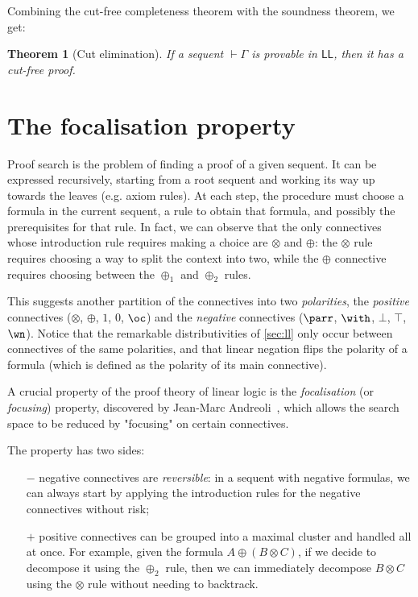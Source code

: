 \documentclass[11pt]{article}
\newtheorem{theorem}{Theorem}[section]
\newcommand\LL{\textsf{LL}}
\newcommand\0{\textbf{0}}
\newcommand\1{\textbf{1}}
\begin{document}
Combining the cut-free completeness theorem with the soundness theorem, we get:
\begin{theorem}[Cut elimination]
    If a sequent $\vdash \Gamma$ is provable in $\LL$, then it has a cut-free proof.
\end{theorem}

\section{\label{sec:focalisation}The focalisation property}

Proof search is the problem of finding a proof of a given sequent. It can be expressed recursively, starting
from a root sequent and working its way up towards the leaves (e.g. axiom rules). At each step, the procedure
must choose a formula in the current sequent, a rule to obtain that formula, and possibly the prerequisites for
that rule. In fact, we can observe that the only connectives whose introduction rule requires making a choice are
$\otimes$ and $\oplus$: the $\otimes$ rule requires choosing a way to split the context into two, while the $\oplus$
connective requires choosing between the $\oplus_1$ and $\oplus_2$ rules.

This suggests another partition of the connectives into two \emph{polarities}, the \emph{positive} connectives
($\otimes$, $\oplus$, $1$, $0$, $\oc$) and the \emph{negative} connectives ($\parr$, $\with$, $\bot$, $\top$, $\wn$).
Notice that the remarkable distributivities of \cref{sec:ll} only occur between connectives of the same polarities,
and that linear negation flips the polarity of a formula (which is defined as the polarity of its main connective).

A crucial property of the proof theory of linear logic is the \emph{focalisation} (or \emph{focusing}) property,
discovered by Jean-Marc Andreoli~\cite{andreoli}, which allows the search space to be reduced by "focusing" on certain
connectives.

The property has two sides:
\begin{itemize}
    \item[$-$] negative connectives are \emph{reversible}: in a sequent with negative formulas,
    we can always start by applying the introduction rules for the negative connectives without risk;
    \item[$+$] positive connectives can be grouped into a maximal cluster and handled all at once.
    For example, given the formula $A \oplus (B \otimes C)$, if we decide to decompose it using the $\oplus_2$ rule,
    then we can immediately decompose $B \otimes C$ using the $\otimes$ rule without needing to backtrack.
\end{itemize}
\end{document}
